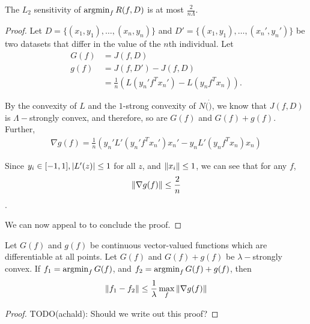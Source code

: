 \documentclass{article} %
\begin{document}
\begin{cor}
The $L_2$ sensitivity of $\operatorname*{argmin}_f R(f, D)$ is at most $\frac{2}{n \Lambda}$.
\label{cor:output_perturb_sensitivity}
\end{cor}
\begin{proof}
Let $D = \{(x_1, y_1), \dots, (x_n, y_n)\}$ and
$D' = \{(x_1, y_1), \dots, (x_n', y_n')\}$
be two datasets that differ in the value of the $n$th individual.
Let
\begin{align*}
G(f) &= J(f, D) \\
g(f) &= J(f, D') - J(f, D) \\
     &= \frac{1}{n} (L(y_n' f^T x_n') - L(y_n f^T x_n)).
\end{align*}

By the convexity of $L$ and the $1$-strong convexity of $N(\dot)$, we know that
$J(f, D)$ is $\Lambda-$strongly convex, and therefore, so are $G(f)$ and
$G(f) + g(f)$.
Further,
\begin{align*}
\nabla g(f)
= \frac{1}{n} \left(y_n' L'(y_n' f^T x_n') x_n' - y_n L'(y_n f^T x_n) x_n\right)
\end{align*}

Since $y_i \in [-1, 1], \left\lvert L'(z)\right\rvert \leq 1$ for all $z$, and
$\left\lVert x_i\right\rVert \leq 1$, we can see that for any $f$,
\begin{align*}
\left\lVert\nabla g(f)\right\rVert \leq \frac{2}{n}
\end{align*}.

We can now appeal to  to conclude the
proof.
\end{proof}

\begin{lemma}
Let $G(f)$ and $g(f)$ be continuous vector-valued functions which are
differentiable at all points. Let $G(f)$ and $G(f) + g(f)$ be $\lambda-$strongly
convex. If $f_1 = \operatorname*{argmin}_f G(f)$, and $f_2 = \operatorname*{argmin}_f G(f) + g(f)$, then
\begin{align*}
\left\lVert f_1 - f_2\right\rVert \leq \frac{1}{\lambda} \max_f \left\lVert\nabla g(f)\right\rVert
\end{align*}
\label{lemma:strong_convex_sensitivity}
\end{lemma}

\begin{proof}
TODO(achald): Should we write out this proof?
\end{proof}
\end{document}
